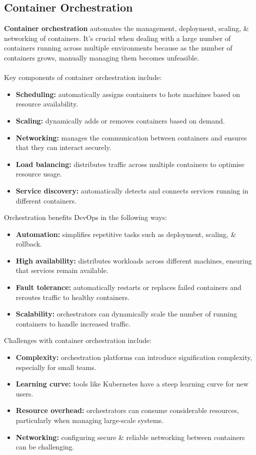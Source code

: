 \documentclass[a4paper,11pt]{article}
\begin{document}
\subsection{Container Orchestration}
\textbf{Container orchestration} automates the management, deployment, scaling, \& networking of containers.
It's crucial when dealing with a large number of containers running across multiple environments because as the
number of containers grows, manually managing them becomes unfeasible.
\\\\
Key components of container orchestration include:
\begin{itemize}
    \item   \textbf{Scheduling:} automatically assigns containers to hots machines based on resource availability.
    \item   \textbf{Scaling:} dynamically adds or removes containers based on demand.
    \item   \textbf{Networking:} manages the communication between containers and ensures that they can interact
            securely.
    \item   \textbf{Load balancing:} distributes traffic across multiple containers to optimise resource usage.
    \item   \textbf{Service discovery:} automatically detects and connects services running in different containers.
\end{itemize}

Orchestration benefits DevOps in the following ways:
\begin{itemize}
    \item   \textbf{Automation:} simplifies repetitive tasks such as deployment, scaling, \& rollback.
    \item   \textbf{High availability:} distributes workloads across different machines, ensuring that services
            remain available.
    \item   \textbf{Fault tolerance:} automatically restarts or replaces failed containers and reroutes traffic
            to healthy containers.
    \item   \textbf{Scalability:} orchestrators can dynamically scale the number of running containers to handle
            increased traffic.
\end{itemize}

Challenges with container orchestration include:
\begin{itemize}
    \item   \textbf{Complexity:} orchestration platforms can introduce signification complexity, especially for
            small teams.
    \item   \textbf{Learning curve:} tools like Kubernetes have a steep learning curve for new users.
    \item   \textbf{Resource overhead:} orchestrators can consume considerable resources, particularly when
            managing large-scale systems.
    \item   \textbf{Networking:} configuring secure \& reliable networking between containers can be challenging.
\end{itemize}
\end{document}
